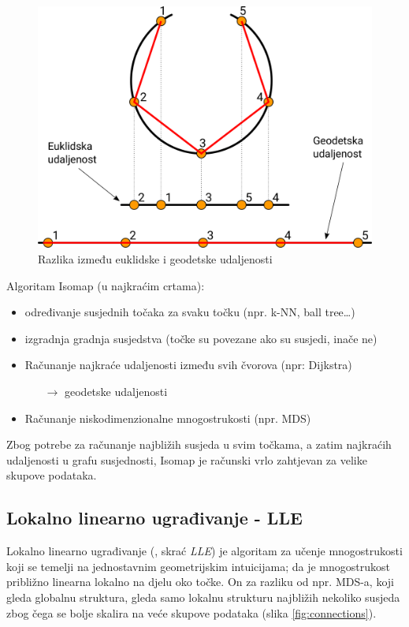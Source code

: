 \documentclass[times, utf8, diplomski]{fer}
\begin{document}
\begin{figure}[htb]
    \centering
    \includegraphics[width=12cm]{resources/images/reduction/euclid_vs_geodetic.png}
    \caption{Razlika između euklidske i geodetske udaljenosti}
    \label{fig:euclid_vs_geodetic}
\end{figure}

Algoritam Isomap (u najkraćim crtama):
\begin{itemize}
    \item određivanje susjednih točaka za svaku točku (npr. k-NN, ball tree\dots)
    \item izgradnja gradnja susjedstva (točke su povezane ako su susjedi, inače ne)
    \item Računanje najkraće udaljenosti između svih čvorova (npr: Dijkstra)
          \begin{itemize}
              \item[$\rightarrow$] geodetske udaljenosti
          \end{itemize}
    \item Računanje niskodimenzionalne mnogostrukosti (npr. MDS)
\end{itemize}

\bigskip
Zbog potrebe za računanje najbližih susjeda u svim točkama, a zatim najkraćih udaljenosti u grafu susjednosti, Isomap je računski vrlo zahtjevan za velike skupove podataka.

\subsection{Lokalno linearno ugrađivanje - LLE}
Lokalno linearno ugrađivanje (, skrać \emph{LLE}) je algoritam za učenje mnogostrukosti koji se temelji na jednostavnim geometrijskim intuicijama; da je mnogostrukost približno linearna lokalno na djelu oko točke. On za razliku od npr. MDS-a, koji gleda globalnu struktura, gleda samo lokalnu strukturu najbližih nekoliko susjeda zbog čega se bolje skalira na veće skupove podataka (slika \ref{fig:connections}).
\end{document}
